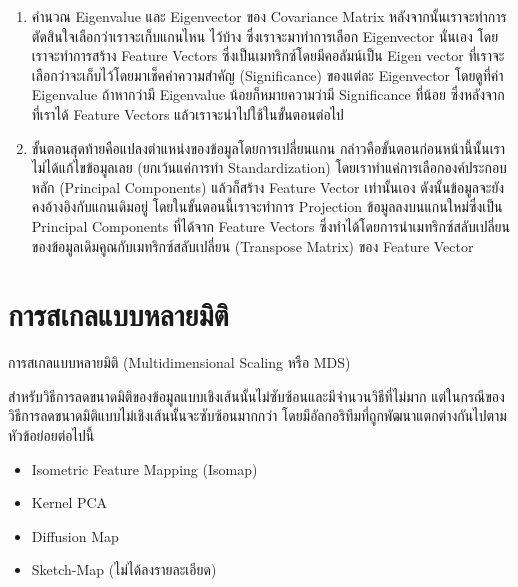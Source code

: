 \begin{enumerate}
    \item คำนวณ Eigenvalue และ Eigenvector ของ Covariance Matrix หลังจากนั้นเราจะทำการตัดสินใจเลือกว่าเราจะเก็บแกนไหน%
    ไว้บ้าง ซึ่งเราจะมาทำการเลือก Eigenvector นั่นเอง โดยเราจะทำการสร้าง Feature Vectors ซึ่งเป็นเมทริกซ์โดยมีคอลัมน์เป็น Eigen%
    vector ที่เราจะเลือกว่าจะเก็บไว้โดยมาเช็คค่าความสำคัญ (Significance) ของแต่ละ Eigenvector โดยดูที่ค่า Eigenvalue ถ้าหากว่ามี
    Eigenvalue น้อยก็หมายความว่ามี Significance ที่น้อย ซึ่งหลังจากที่เราได้ Feature Vectors แล้วเราจะนำไปใช้ในขั้นตอนต่อไป

    \item ขั้นตอนสุดท้ายคือแปลงตำแหน่งของข้อมูลโดยการเปลี่ยนแกน กล่าวคือขั้นตอนก่อนหน้านี้นั้นเราไม่ได้แก้ไขข้อมูลเลย (ยกเว้นแค่การทำ 
    Standardization) โดยเราทำแค่การเลือกองค์ประกอบหลัก (Principal Components) แล้วก็สร้าง Feature Vector เท่านั้นเอง 
    ดังนั้นข้อมูลจะยังคงอ้างอิงกับแกนเดิมอยู่ โดยในขั้นตอนนี้เราจะทำการ Projection ข้อมูลลงบนแกนใหม่ซึ่งเป็น Principal Components 
    ที่ได้จาก Feature Vectors ซึ่งทำได้โดยการนำเมทริกซ์สลับเปลี่ยนของข้อมูลเดิมคูณกับเมทริกซ์สลับเปลี่ยน (Transpose Matrix) ของ 
    Feature Vector

\end{enumerate}

\section{การสเกลแบบหลายมิติ}
\label{sec:mds}

การสเกลแบบหลายมิติ (Multidimensional Scaling หรือ MDS)\autocite{young1938,torgerson1952}

สำหรับวิธีการลดขนาดมิติของข้อมูลแบบเชิงเส้นนั้นไม่ซับซ้อนและมีจำนวนวิธีที่ไม่มาก แต่ในกรณีของวิธีการลดขนาดมิติแบบไม่เชิงเส้นนั้นจะซับซ้อนมากกว่า
โดยมีอัลกอริทึมที่ถูกพัฒนาแตกต่างกันไปตามหัวข้อย่อยต่อไปนี้\autocite{glielmo2021}

\begin{itemize}[topsep=0pt]
    \item Isometric Feature Mapping (Isomap)
    
    \item Kernel PCA
    
    \item Diffusion Map
    
    \item Sketch-Map (ไม่ได้ลงรายละเอียด)
\end{itemize}

